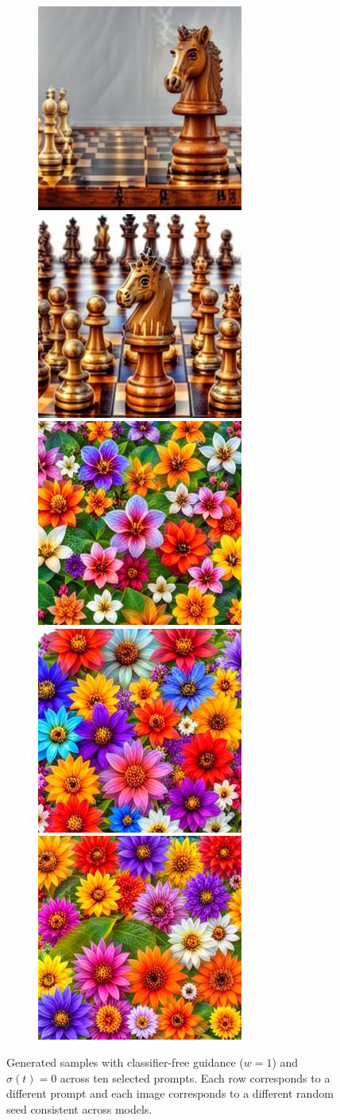 \begin{figure}[h!]
\begin{subfigure}[t]{0.32\linewidth}
	\includegraphics[width=0.320\linewidth]{figs/samples_appendix_3/draft1k_cfg_2_ode_prompt_75_image_2.jpg}\;%
	\includegraphics[width=0.320\linewidth]{figs/samples_appendix_3/draft1k_cfg_2_ode_prompt_75_image_3.jpg}\\ 
	\includegraphics[width=0.320\linewidth]{figs/samples_appendix_3/draft1k_cfg_2_ode_prompt_90_image_1.jpg}\;%
	\includegraphics[width=0.320\linewidth]{figs/samples_appendix_3/draft1k_cfg_2_ode_prompt_90_image_2.jpg}\;%
	\includegraphics[width=0.320\linewidth]{figs/samples_appendix_3/draft1k_cfg_2_ode_prompt_90_image_3.jpg}
    \end{subfigure}
    \caption{
    Generated samples with classifier-free guidance ($w=1$) and $\sigma(t)=0$ across ten selected prompts.  Each row corresponds to a different prompt and each image corresponds to a different random seed consistent across models.
    }
    \label{fig:image_comparison_v2}
\end{figure}

